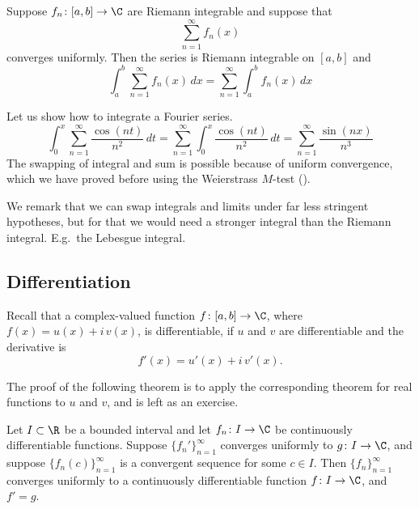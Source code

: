 \begin{cor}
\pagebreak[2]
Suppose $f_n \colon [a,b] \to \C$
are Riemann integrable and suppose that
\begin{equation*}
\sum_{n=1}^\infty f_n(x)
\end{equation*}
converges uniformly.  Then the series is Riemann integrable on $[a,b]$
and
\begin{equation*}
\int_a^b \sum_{n=1}^\infty f_n(x) \,dx
=
\sum_{n=1}^\infty \int_a^b f_n(x) \,dx
\end{equation*}
\end{cor}

\begin{example}
Let us show how to integrate a Fourier series.
\begin{equation*}
\int_{0}^x \sum_{n=1}^\infty \frac{\cos(nt)}{n^2} \,dt
=
\sum_{n=1}^\infty \int_{0}^x \frac{\cos(nt)}{n^2}\,dt
=
\sum_{n=1}^\infty \frac{\sin(nx)}{n^3}
\end{equation*}
The swapping of integral and sum is possible because of uniform convergence,
which we have proved before using the Weierstrass $M$-test
().
\end{example}

We remark that we can swap integrals and limits under far less stringent hypotheses,
but for that we would need a stronger integral than the Riemann integral.
E.g.\ the Lebesgue integral.

\subsection{Differentiation}

Recall that a complex-valued function
$f \colon [a,b] \to \C$, where $f(x) = u(x)+i\,v(x)$,
is differentiable, if $u$ and $v$ are differentiable
and the derivative is
\begin{equation*}
f'(x) = u'(x)+i\,v'(x) .
\end{equation*}

The proof of the following theorem is to apply the corresponding theorem for
real functions to $u$ and $v$, and is left as an exercise.

\begin{thm} \label{thm:dersconvergecomplex}
Let $I \subset \R$ be a bounded interval and let
$f_n \colon I \to \C$ be continuously differentiable functions.
Suppose $\{ f_n' \}_{n=1}^\infty$ converges uniformly to $g \colon I \to \C$,
and suppose $\{ f_n(c) \}_{n=1}^\infty$ is a
convergent sequence for some $c \in I$.  Then $\{ f_n \}_{n=1}^\infty$ converges uniformly to 
a continuously differentiable function $f \colon I \to \C$, and $f' = g$.
\end{thm}


